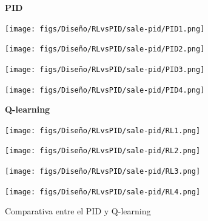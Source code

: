 \begin{figure}[H]
  \centering

  \textbf{PID}
  \vspace{0.3cm}

  \begin{minipage}[t]{0.2\textwidth}
      \centering
      \texttt{[image: figs/Diseño/RLvsPID/sale-pid/PID1.png]}
      \caption*{}
  \end{minipage}
  \hfill
  \begin{minipage}[t]{0.2\textwidth}
      \centering
      \texttt{[image: figs/Diseño/RLvsPID/sale-pid/PID2.png]}
      \caption*{}
  \end{minipage}
  \hfill
  \begin{minipage}[t]{0.2\textwidth}
      \centering
      \texttt{[image: figs/Diseño/RLvsPID/sale-pid/PID3.png]}
      \caption*{}
  \end{minipage}
  \hfill
  \begin{minipage}[t]{0.2\textwidth}
      \centering
      \texttt{[image: figs/Diseño/RLvsPID/sale-pid/PID4.png]}
      \caption*{}
  \end{minipage}
  \vspace{0.5cm}

  \textbf{Q-learning}
  \vspace{0.3cm}

  \begin{minipage}[t]{0.2\textwidth}
      \centering
      \texttt{[image: figs/Diseño/RLvsPID/sale-pid/RL1.png]}
  \end{minipage}
  \hfill
  \begin{minipage}[t]{0.2\textwidth}
      \centering
      \texttt{[image: figs/Diseño/RLvsPID/sale-pid/RL2.png]}
  \end{minipage}
  \hfill
  \begin{minipage}[t]{0.2\textwidth}
      \centering
      \texttt{[image: figs/Diseño/RLvsPID/sale-pid/RL3.png]}
  \end{minipage}
  \hfill
  \begin{minipage}[t]{0.2\textwidth}
      \centering
      \texttt{[image: figs/Diseño/RLvsPID/sale-pid/RL4.png]}
  \end{minipage}
  \caption{Comparativa entre el PID y Q-learning}
  \label{comparativa-PID-qlearning}
\end{figure}


  

